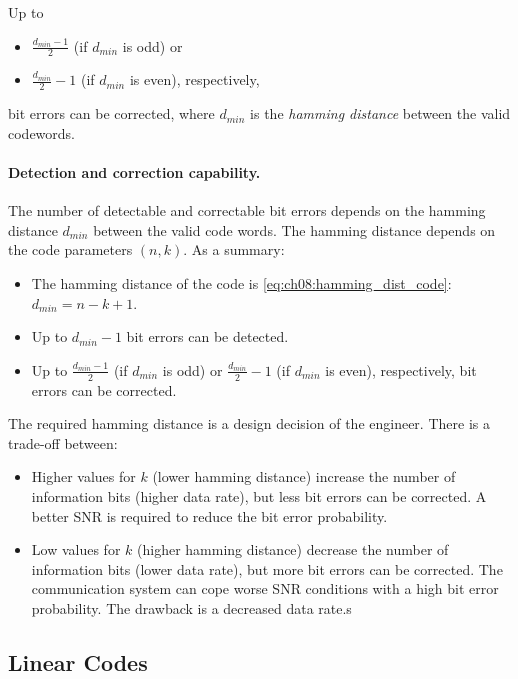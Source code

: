 \begin{refsection}
\begin{fact}
	Up to
	\begin{itemize}
		\item $\frac{d_{min}-1}{2}$ (if $d_{min}$ is odd) or
		\item $\frac{d_{min}}{2} - 1$ (if $d_{min}$ is even), respectively,
	\end{itemize} 
	bit errors can be corrected, where $d_{min}$ is the \emph{hamming distance} between the valid codewords.
\end{fact}

\paragraph{Detection and correction capability.}

The number of detectable and correctable bit errors depends on the hamming distance $d_{min}$ between the valid code words. The hamming distance depends on the code parameters $(n, k)$. As a summary:
\begin{itemize}
	\item The hamming distance of the code is \eqref{eq:ch08:hamming_dist_code}: $d_{min} = n - k + 1$.
	\item Up to $d_{min} - 1$ bit errors can be detected.
	\item Up to $\frac{d_{min}-1}{2}$ (if $d_{min}$ is odd) or $\frac{d_{min}}{2} - 1$ (if $d_{min}$ is even), respectively, bit errors can be corrected.
\end{itemize}

The required hamming distance is a design decision of the engineer. There is a trade-off between:
\begin{itemize}
	\item Higher values for $k$ (lower hamming distance) increase the number of information bits (higher data rate), but less bit errors can be corrected. A better \ac{SNR} is required to reduce the bit error probability.
	\item Low values for $k$ (higher hamming distance) decrease the number of information bits (lower data rate), but more bit errors can be corrected. The communication system can cope worse \ac{SNR} conditions with a high bit error probability. The drawback is a decreased data rate.s
\end{itemize}


\subsection{Linear Codes}


{}
\printbibliography[heading=subbibliography]
\end{refsection}

